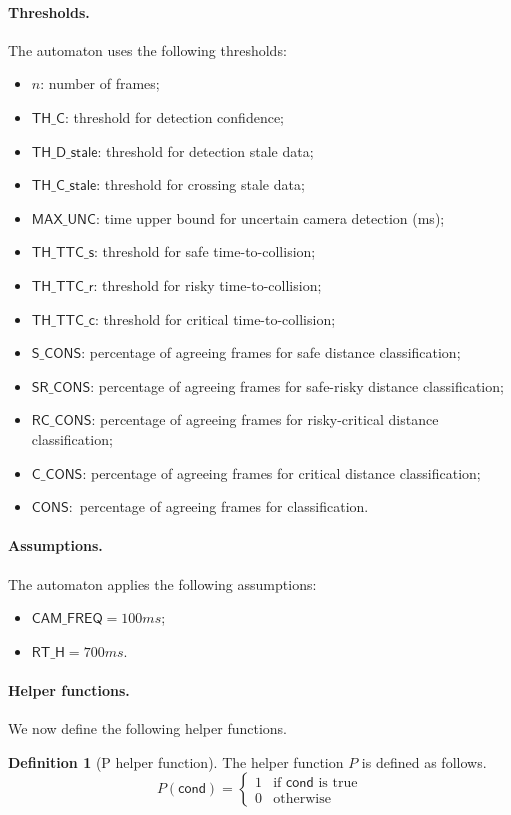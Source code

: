 \documentclass[12pt]{article}
\theoremstyle{definition}
\newtheorem{definition}{Definition}[section]
\begin{document}
\paragraph{Thresholds.} The automaton uses the following thresholds:
\begin{itemize}
    \item $n$: number of frames;
    \item $\mathsf{TH\_C}$: threshold for detection confidence;
    \item $\mathsf{TH\_D\_stale}$: threshold for detection stale data;
    \item $\mathsf{TH\_C\_stale}$: threshold for crossing stale data;
    \item $\mathsf{MAX\_UNC}$: time upper bound for uncertain camera detection (ms);
    \item $\mathsf{TH\_TTC\_s}$: threshold for safe time-to-collision;
    \item $\mathsf{TH\_TTC\_r}$: threshold for risky time-to-collision;
    \item $\mathsf{TH\_TTC\_c}$: threshold for critical time-to-collision;
    \item $\mathsf{S\_CONS}$: percentage of agreeing frames for safe distance classification; 
    \item $\mathsf{SR\_CONS}$: percentage of agreeing frames for safe-risky distance classification;
    \item $\mathsf{RC\_CONS}$: percentage of agreeing frames for risky-critical distance classification;
    \item $\mathsf{C\_CONS}$: percentage of agreeing frames for critical distance classification;
    \item $\mathsf{CONS}: $ percentage of agreeing frames for classification.
\end{itemize}

\paragraph{Assumptions.} The automaton applies the following assumptions:
\begin{itemize}
    \item $\mathsf{CAM\_FREQ} = 100ms$;
    \item $\mathsf{RT\_H} = 700ms$.
\end{itemize}

\paragraph{Helper functions.} We now define the following helper functions.
\begin{definition}[P helper function]
    The helper function $P$ is defined as follows.
\[
    P(\mathsf{cond}) =
    \begin{cases}
        1 & \text{if } \mathsf{cond} \text{ is true} \\
        0 & \text{otherwise}
    \end{cases}
\]
\end{definition}
\end{document}
